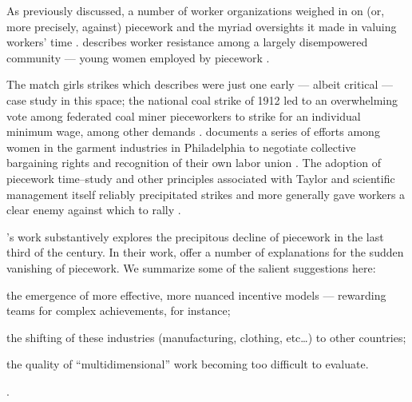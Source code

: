 \documentclass[trackingWork]{subfiles}
\begin{document}
As previously discussed, a number of worker organizations weighed in on
(or, more precisely, against) piecework and the myriad oversights it made in valuing workers' time
\cite{american1921problem,richards1904anything}.
\citeauthor{10.2307/3827491} describes worker resistance among a largely disempowered community --- young women employed by piecework
\cite{10.2307/3827491}.

The match girls strikes which \citeauthor{10.2307/3827491} describes were just one early
--- albeit critical ---
case study in this space;
the national coal strike of 1912 led to an overwhelming vote among federated coal miner pieceworkers
to strike for
an individual minimum wage, among other demands
\cite{10.2307/2221944}.
\citeauthor{10.2307/41829256} documents a series of efforts among women in the garment industries in Philadelphia to negotiate collective bargaining rights and recognition of their own labor union
\cite{10.2307/41829256}.
The adoption of piecework time--study and other principles associated with Taylor and scientific management
itself reliably precipitated strikes and more generally gave workers a clear enemy
against which to rally
\cite{jacoby1983union}.

\citeauthor{hart2013rise}'s work substantively explores the precipitous decline of piecework in the last third of the  century.
In their work, \citeauthor{hart2013rise} offer a number of explanations for the sudden vanishing of piecework.
We summarize some of the salient suggestions here:
\begin{inlinelist}
\item the emergence of more effective, more nuanced incentive models
--- rewarding teams for complex achievements, for instance;
\item the shifting of these industries (manufacturing, clothing, etc\dots)
to other countries;
\item the quality of ``multidimensional'' work becoming too difficult to evaluate.
\end{inlinelist}
\cite{hart2013rise}.
\end{document}
